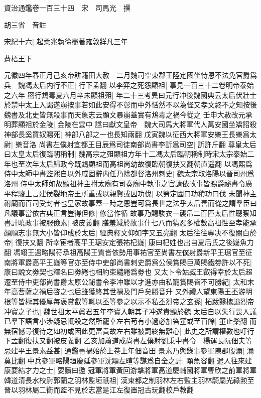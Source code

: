 資治通鑑卷一百三十四　宋　司馬光　撰

胡三省　音註

宋紀十六|{
	起柔兆執徐盡著雍敦牂凡三年}


蒼梧王下

元徽四年春正月己亥帝耕籍田大赦　二月魏司空東郡王陸定國坐恃恩不法免官爵爲兵　魏馮太后内行不正|{
	行下孟翻}
以李弈之死怨顯祖|{
	事見一百三十二卷明帝泰始之六年}
密行鴆毒夏六月辛未顯祖殂|{
	年二十三考異曰元行冲後魏國典云太后伏壯士於禁中太上入謁遂崩按事若如此安得不彰而中外恬然不以為怪又孝文終不之知按後魏書及北史皆無殺事而天象志云顯文暴崩蓋實有鴆毒之禍今從之}
壬申大赦改元承明葬顯祖於金陵|{
	金陵在雲中}
諡曰獻文皇帝　魏大司馬大將軍代人萬安國坐矯詔殺神部長奚買奴賜死|{
	神部八部之一也長知兩翻}
戊寅魏以征西大將軍安樂王長樂爲太尉|{
	樂音洛}
尚書左僕射宜都王目辰爲司徒南部尚書李訢爲司空|{
	訢許斤翻}
尊皇太后曰太皇太后復臨朝稱制|{
	魏高宗之殂顯祖方年十二馮太后臨朝稱制時宋太宗泰始二年也至次年太后歸政今既鴆顯祖而高祖尚幼故復臨朝復扶又翻朝直遥翻}
以馮熙爲侍中太師中書監熙自以外戚固辭内任乃除都督洛州刺史|{
	魏太宗取洛陽以晉司州爲洛州}
侍中太師如故顯祖神主袝太廟有司奏廟中執事之官請依故事皆賜爵祕書令廣平程駿上言建侯裂地帝王所重或以親賢或因功伐|{
	以勞定國曰功積功曰伐}
未聞神主祔廟而百司受封者也皇家故事蓋一時之恩豈可爲長世之法乎太后善而從之謂羣臣曰凡議事當依古典正言豈得但修|{
	修當作循}
故事乃賜駿衣一襲帛二百匹太后性聰察知書計曉政事被服儉素|{
	被皮義翻}
膳羞減於故事什七八而猜忍多權數高祖性至孝能承顔順志事無大小皆仰成於太后|{
	經典釋文仰如字又五亮翻}
太后往往專决不復關白於帝|{
	復扶又翻}
所幸宦者高平王琚安定張祐杞嶷|{
	康曰杞姓也出自夏后氏之後嶷魚力翻}
馮翊王遇略陽苻承祖高陽王質皆依勢用事祐官至尚書左僕射爵新平王琚官至征南將軍爵高平王嶷等官亦至侍中吏部尚書刺史爵爲公侯賞賜巨萬賜鐵劵許以不死|{
	康曰說文劵契也釋名曰劵綣也相約束繾綣爲劵也}
又太卜令姑臧王叡得幸於太后超遷至侍中吏部尚書爵太原公祕書令李冲雖以才進亦由私寵賞賜皆不可勝紀|{
	太和末年高菩薩之禍后啓之也后雖獲終其世禍及門戶矣勝音升}
又外禮人望東陽王丕游明根等皆極其優厚每褒賞叡等輒以丕等參之以示不私丕烈帝之玄孫|{
	柘跋翳槐謚烈帝}
冲寶之子也|{
	魏世祖太平眞君五年李寶入朝其子冲遂貴顯於魏}
太后自以失行畏人議已羣下語言小涉疑忌輒殺之然所寵幸左右苟有小過必加笞箠或至百餘|{
	箠止橤翻}
而無宿憾尋復待之如初或因此更富貴故左右雖被罰終無離心|{
	此史之所謂權數也吁行下孟翻復扶又翻被皮義翻}
乙亥加蕭道成尚書左僕射劉秉中書令　楊運長阮佃夫等忌建平王景素益甚|{
	通鑑書禍始於上卷上年佃音田}
景素乃與錄事參軍陳郡殷濔|{
	濔莫比翻}
中兵參軍略陽垣慶延參軍沈顒左暄等謀爲自全之計|{
	顒魚容翻}
遣人往來建康要結才力之士|{
	要讀曰邀}
冠軍將軍黃回游擊將軍高道慶輔國將軍曹欣之前軍將軍韓道清長水校尉郭蘭之羽林監垣祇祖|{
	漢東都之制羽林左右監主羽林騎屬光祿勲至晉以羽林屬二衛而監不見於志當是江左復置冠古玩翻校戶教翻}

